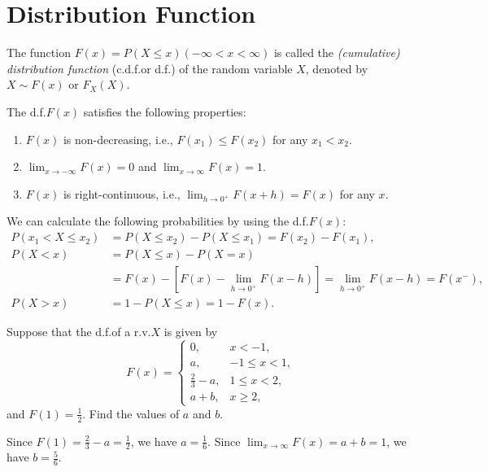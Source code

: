 \section{Distribution Function}

\begin{definition}
  The function \(F(x) = P(X \leq x) (-\infty < x < \infty)\) is called the \emph{(cumulative) distribution function} (c.d.f.\@ or d.f.) of the random variable \(X\), denoted by \(X \sim F(x)\) or \(F_X(X)\).
\end{definition}

\begin{proposition}
  The d.f.\@ \(F(x)\) satisfies the following properties:
  \begin{enumerate}
    \item \(F(x)\) is non-decreasing, i.e., \(F(x_1) \leq F(x_2)\) for any \(x_1 < x_2\).
    \item \(\lim_{x \to -\infty} F(x) = 0\) and \(\lim_{x \to \infty} F(x) = 1\).
    \item \(F(x)\) is right-continuous, i.e., \(\lim_{h \to 0^+} F(x + h) = F(x)\) for any \(x\).
  \end{enumerate}
\end{proposition}

We can calculate the following probabilities by using the d.f.\@ \(F(x)\):
\begin{align*}
  P(x_1 < X \leq x_2) & = P(X \leq x_2) - P(X \leq x_1) = F(x_2) - F(x_1), \\
  P(X < x) & = P(X \leq x) - P(X = x) \\
  & = F(x) - [F(x) - \lim_{h \to 0^+} F(x - h)] = \lim_{h \to 0^+} F(x - h) = F(x^-), \\
  P(X > x) & = 1 - P(X \leq x) = 1 - F(x).
\end{align*}

\begin{example}
  Suppose that the d.f.\@ of a r.v.\@ \(X\) is given by
  \[
    F(x) = \begin{cases}
      0, & x < -1, \\
      a, & -1 \leq x < 1, \\
      \frac{2}{3} - a, & 1 \leq x < 2, \\
      a + b, & x \geq 2,
    \end{cases}
  \]
  and \(F(1) = \frac{1}{2}\). Find the values of \(a\) and \(b\).
\end{example}
\begin{solution}
  Since \(F(1) = \frac{2}{3} - a = \frac{1}{2}\), we have \(a = \frac{1}{6}\). Since \(\lim_{x \to \infty} F(x) = a + b = 1\), we have \(b = \frac{5}{6}\).
\end{solution}

